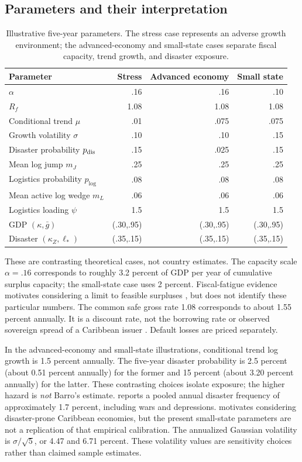 \documentclass[11pt]{article}
\begin{document}


\subsection{Parameters and their interpretation}\label{subsec:calibration}
\begin{table}[t]
\centering\small
\caption{Illustrative five-year parameters. The stress case represents an adverse growth environment; the advanced-economy and small-state cases separate fiscal capacity, trend growth, and disaster exposure.}\label{tab:params}
\begin{tabular}{@{}lrrr@{}}\toprule
Parameter & Stress & Advanced economy & Small state \\\midrule
$\alpha$ & .16 & .16 & .10 \\
$R_f$ & 1.08 & 1.08 & 1.08 \\
Conditional trend $\mu$ & .01 & .075 & .075 \\
Growth volatility $\sigma$ & .10 & .10 & .15 \\
Disaster probability $p_{\rm dis}$ & .15 & .025 & .15 \\
Mean log jump $m_J$ & .25 & .25 & .25 \\
Logistics probability $p_{\log}$ & .08 & .08 & .08 \\
Mean active log wedge $m_L$ & .06 & .06 & .06 \\
Logistics loading $\psi$ & 1.5 & 1.5 & 1.5 \\
GDP $(\kappa,\bar g)$ & (.30,.95) & (.30,.95) & (.30,.95) \\
Disaster $(\kappa_Z,\ell_*)$ & (.35,.15) & (.35,.15) & (.35,.15) \\\bottomrule
\end{tabular}
\end{table}
These are contrasting theoretical cases, not country estimates. The capacity scale $\alpha=.16$ corresponds to roughly 3.2 percent of GDP per year of cumulative surplus capacity; the small-state case uses 2 percent. Fiscal-fatigue evidence motivates considering a limit to feasible surpluses \parencite{GhoshEtAl2013}, but does not identify these particular numbers. The common safe gross rate 1.08 corresponds to about 1.55 percent annually. It is a discount rate, not the borrowing rate or observed sovereign spread of a Caribbean issuer \parencite{Blanchard2019}. Default losses are priced separately.

In the advanced-economy and small-state illustrations, conditional trend log growth is 1.5 percent annually. The five-year disaster probability is 2.5 percent (about 0.51 percent annually) for the former and 15 percent (about 3.20 percent annually) for the latter. These contrasting choices isolate exposure; the higher hazard is \emph{not} Barro's estimate. \textcite{Barro2006} reports a pooled annual disaster frequency of approximately 1.7 percent, including wars and depressions. \textcite{Mallucci2022} motivates considering disaster-prone Caribbean economies, but the present small-state parameters are not a replication of that empirical calibration. The annualized Gaussian volatility is $\sigma/\sqrt5$, or 4.47 and 6.71 percent. These volatility values are sensitivity choices rather than claimed sample estimates.
\end{document}
